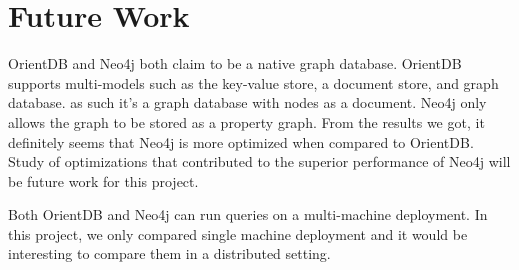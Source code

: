 \section{Future Work}
OrientDB and Neo4j both claim to be a native graph database. OrientDB supports multi-models such as the key-value store, a document store, and graph database. as such it's a graph database with nodes as a document. Neo4j only allows the graph to be stored as a property graph. From the results we got, it definitely seems that Neo4j is more optimized when compared to OrientDB. Study of optimizations that contributed to the superior performance of Neo4j will be future work for this project.

Both OrientDB and Neo4j can run queries on a multi-machine deployment. In this project, we only compared single machine deployment and it would be interesting to compare them in a distributed setting. 
